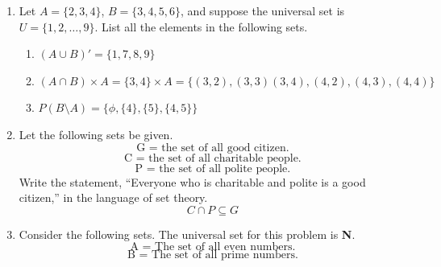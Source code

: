 \documentclass[12pt]{article}
\begin{document}
\begin{enumerate}
\begin{center}
    \end{center}
  \item Let $A = \{2, 3, 4\}$, $B = \{3, 4, 5, 6\}$, and suppose the universal set is $U = \{1, 2, …, 9\}$. List all the elements in the following sets.
  \begin{enumerate}
    \item $(A \cup B)' = \{1,7,8,9\}$
    \item $(A \cap B) \times A = \{3,4\} \times A = \{(3,2),(3,3)(3,4),(4,2),(4,3),(4,4)\}$ 
    \item $P(B\setminus A) = \{\phi, \{4\}, \{5\}, \{4,5\}\}$
  \end{enumerate}
  \item Let the following sets be given.
    \[\text{G = the set of all good citizen.}\]
    \[\text{C = the set of all charitable people.}\]
    \[\text{P = the set of all polite people.}\]
    Write the statement, “Everyone who is charitable and polite is a good citizen,” in the language of set theory.
    \[C \cap P \subseteq G\]
  \item Consider the following sets. The universal set for this problem is \textbf{N}.
    \[\text{A = The set of all even numbers.}\]
    \[\text{B = The set of all prime numbers.}\]
    \[\text{}\]
\end{enumerate}
\end{document}
